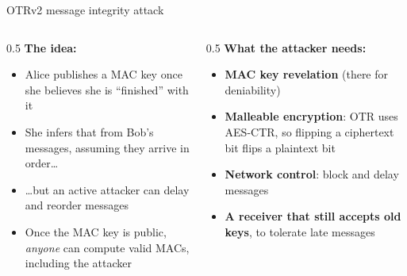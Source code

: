 \ifdefined\PRESENTATION\else\PassOptionsToClass{handout}{beamer}\fi\documentclass[aspectratio=169, lualatex]{beamer}
\begin{document}
\begin{frame}{OTRv2 message integrity attack}
	\begin{columns}[c]
		\begin{column}{0.5\textwidth}
			\textbf{The idea:}
			\begin{itemize}
				\item Alice publishes a MAC key once she believes she is ``finished'' with it
				\item She infers that from Bob's messages, assuming they arrive in order\ldots
				\item \ldots but an active attacker can delay and reorder messages
				\item Once the MAC key is public, \textit{anyone} can compute valid MACs, including the attacker
			\end{itemize}
		\end{column}
		\begin{column}{0.5\textwidth}
			\textbf{What the attacker needs:}
			\begin{itemize}
				\item \textbf{MAC key revelation} (there for deniability)
				\item \textbf{Malleable encryption}: OTR uses AES-CTR, so flipping a ciphertext bit flips a plaintext bit
				\item \textbf{Network control}: block and delay messages
				\item \textbf{A receiver that still accepts old keys}, to tolerate late messages
			\end{itemize}
		\end{column}
	\end{columns}
\end{frame}
\end{document}
